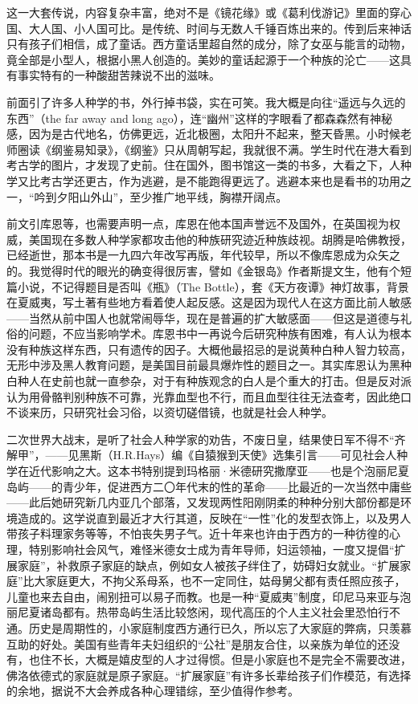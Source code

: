 \par 这一大套传说，内容复杂丰富，绝对不是《镜花缘》或《葛利伐游记》里面的穿心国、大人国、小人国可比。是传统、时间与无数人千锤百炼出来的。传到后来神话只有孩子们相信，成了童话。西方童话里超自然的成分，除了女巫与能言的动物，竟全部是小型人，根据小黑人创造的。美妙的童话起源于一个种族的沦亡——这具有事实特有的一种酸甜苦辣说不出的滋味。
\par 前面引了许多人种学的书，外行掉书袋，实在可笑。我大概是向往“遥远与久远的东西”（the far away and long ago），连“幽州”这样的字眼看了都森森然有神秘感，因为是古代地名，仿佛更远，近北极圈，太阳升不起来，整天昏黑。小时候老师圈读《纲鉴易知录》，《纲鉴》只从周朝写起，我就很不满。学生时代在港大看到考古学的图片，才发现了史前。住在国外，图书馆这一类的书多，大看之下，人种学又比考古学还更古，作为逃避，是不能跑得更远了。逃避本来也是看书的功用之一，“吟到夕阳山外山”，至少推广地平线，胸襟开阔点。
\par 前文引库恩等，也需要声明一点，库恩在他本国声誉远不及国外，在英国视为权威，美国现在多数人种学家都攻击他的种族研究迹近种族歧视。胡腾是哈佛教授，已经逝世，那本书是一九四六年改写再版，年代较早，所以不像库恩成为众矢之的。我觉得时代的眼光的确变得很厉害，譬如《金银岛》作者斯提文生，他有个短篇小说，不记得题目是否叫《瓶》（The Bottle），套《天方夜谭》神灯故事，背景在夏威夷，写土著有些地方看着使人起反感。这是因为现代人在这方面比前人敏感——当然从前中国人也就常闹辱华，现在是普遍的扩大敏感面——但这是道德与礼俗的问题，不应当影响学术。库恩书中一再说今后研究种族有困难，有人认为根本没有种族这样东西，只有遗传的因子。大概他最招忌的是说黄种白种人智力较高，无形中涉及黑人教育问题，是美国目前最具爆炸性的题目之一。其实库恩认为黑种白种人在史前也就一直参杂，对于有种族观念的白人是个重大的打击。但是反对派认为用骨骼判别种族不可靠，光靠血型也不行，而且血型往往无法查考，因此绝口不谈来历，只研究社会习俗，以资切磋借镜，也就是社会人种学。
\par 二次世界大战末，是听了社会人种学家的劝告，不废日皇，结果使日军不得不“齐解甲”，——见黑斯（H.R.Hays）编《自猿猴到天使》选集引言——可见社会人种学在近代影响之大。这本书特别提到玛格丽·米德研究撒摩亚——也是个泡丽尼夏岛屿——的青少年，促进西方二〇年代末的性的革命——比最近的一次当然中庸些——此后她研究新几内亚几个部落，又发现两性阳刚阴柔的种种分别大部份都是环境造成的。这学说直到最近才大行其道，反映在“一性”化的发型衣饰上，以及男人带孩子料理家务等等，不怕丧失男子气。近十年来也许由于西方的一种彷徨的心理，特别影响社会风气，难怪米德女士成为青年导师，妇运领袖，一度又提倡“扩展家庭”，补救原子家庭的缺点，例如女人被孩子绊住了，妨碍妇女就业。“扩展家庭”比大家庭更大，不拘父系母系，也不一定同住，姑母舅父都有责任照应孩子，儿童也来去自由，闹别扭可以易子而教。也是一种“夏威夷”制度，印尼马来亚与泡丽尼夏诸岛都有。热带岛屿生活比较悠闲，现代高压的个人主义社会里恐怕行不通。历史是周期性的，小家庭制度西方通行已久，所以忘了大家庭的弊病，只羡慕互助的好处。美国有些青年夫妇组织的“公社”是朋友合住，以亲族为单位的还没有，也住不长，大概是嬉皮型的人才过得惯。但是小家庭也不是完全不需要改进，佛洛依德式的家庭就是原子家庭。“扩展家庭”有许多长辈给孩子们作模范，有选择的余地，据说不大会养成各种心理错综，至少值得作参考。

